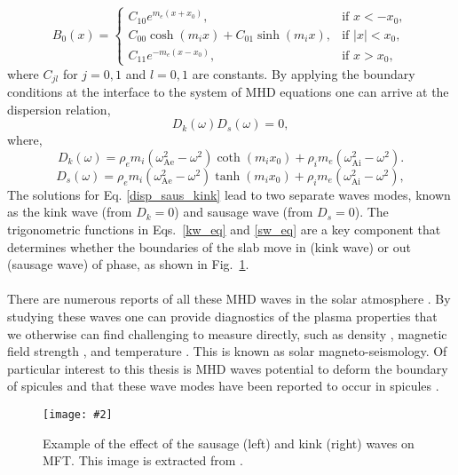 \documentclass[12pt]{ociamthesis}
\newcommand{\eref}[1]{Eq. \eqref{#1}}
\newcommand{\mfig}[4]{
  \begin{figure}
  \begin{center}
  \texttt{[image: \#2]}
  \caption{#3}
  \label{#4}
  \end{center}
  \end{figure}}
\newcommand{\np}{\\ \\}
\begin{document}
\begin{equation}
        B_0(x) = 
    \begin{cases}
      C_{10} e^{m_e (x+x_0)}, &  \text{if } x < -x_0, \\
      C_{00} \cosh{(m_i x)} + C_{01} \sinh{(m_i x)}, & \text{if } |x| < x_0, \\
      C_{11} e^{-m_e(x-x_0)}, & \text{if } x > x_0,
    \end{cases}
\end{equation}
where $C_{jl}$ for $j=0,1$ and $l=0,1$ are constants. By applying the boundary conditions at the interface to the system of MHD equations one can arrive at the dispersion relation,
\begin{equation}\label{disp_saus_kink}
    D_k(\omega)D_s(\omega)  = 0,
\end{equation}
where,
\begin{equation}\label{kw_eq}
    D_k(\omega) = \rho_em_i(\omega_\textrm{Ae}^2 - \omega^2)\coth{(m_ix_0)} + \rho_im_e(\omega_\textrm{Ai}^2 - \omega^2).
\end{equation}
\begin{equation}\label{sw_eq}
    D_s(\omega) = \rho_em_i(\omega_\textrm{Ae}^2 - \omega^2)\tanh{(m_ix_0)} + \rho_im_e(\omega_\textrm{Ai}^2 - \omega^2),
\end{equation}
The solutions for \eref{disp_saus_kink} lead to two separate waves modes, known as the kink wave (from $D_k =0$) and sausage wave (from $D_s =0$). The trigonometric functions in Eqs.~\eqref{kw_eq} and \eqref{sw_eq} are a key component that determines whether the boundaries of the slab move in (kink wave) or out (sausage wave) of phase, as shown in Fig.~\ref{KW_SW}. \np
%
There are numerous reports of all these MHD waves in the solar atmosphere \citep{Tomczyk2007Sci3171192T, Tomczyk2009ApJ6971384T, jess_alfven_2009, Morton2012NatCo31315M}. By studying these waves one can provide diagnostics of the plasma properties that we otherwise can find challenging to measure directly, such as density \citep{Verwichte_2013A_A}, magnetic field strength \citep{Nakariakov_2001}, and temperature \citep{De_Moortel_2003SoPh}. This is known as solar magneto-seismology. Of particular interest to this thesis is MHD waves potential to deform the boundary of spicules and that these wave modes have been reported to occur in spicules \citep{Kukhianidze2006AA, Okamoto2011ApJ736L24O, Jess2012ApJ744L5J, Verth2016GMS216431V, Sharma2018ApJ85361S}.
\mfig{0.75}{figures/KW_SW.png}{Example of the effect of the sausage (left) and kink (right) waves on MFT. This image is extracted from \cite{Morton2012NatCo31315M}.}{KW_SW}
\end{document}
